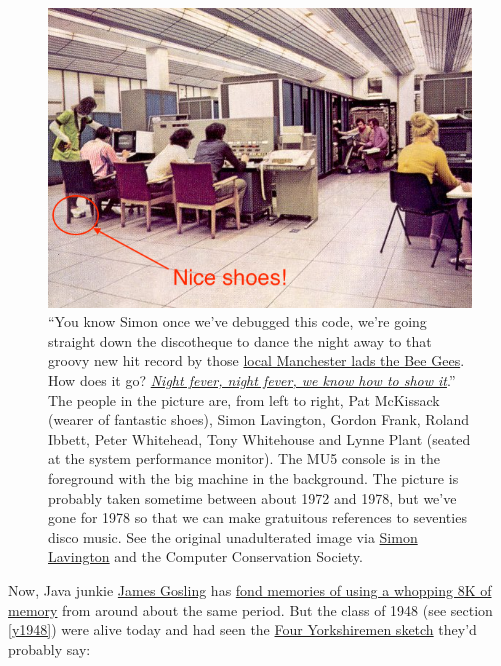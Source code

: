 \documentclass[
  12pt,
]{book}
\begin{document}
\begin{figure}

{\centering \includegraphics[width=0.99\linewidth]{images/classof1970something2} 

}

\caption{``You know Simon once we've debugged this code, we're going straight down the discotheque to dance the night away to that groovy new hit record by those \href{https://en.wikipedia.org/wiki/Bee_Gees}{local Manchester lads the Bee Gees}. How does it go? \emph{\href{https://en.wikipedia.org/wiki/Night_Fever}{Night fever, night fever, we know how to show it}}.'' The people in the picture are, from left to right, Pat McKissack (wearer of fantastic shoes), Simon Lavington, Gordon Frank, Roland Ibbett, Peter Whitehead, Tony Whitehouse and Lynne Plant (seated at the system performance monitor). The MU5 console is in the foreground with the big machine in the background. The picture is probably taken sometime between about 1972 and 1978, but we've gone for 1978 so that we can make gratuitous references to seventies disco music. See the original unadulterated image via \href{http://www.computinghistory.org.uk/det/3638/Simon-Lavington/}{Simon Lavington} and the Computer Conservation Society. \citep{mu5}}\label{fig:mu5-fig}
\end{figure}



Now, Java junkie \href{https://en.wikipedia.org/wiki/James_Gosling}{James Gosling} has \href{http://web.archive.org/web/20041010131526/http://today.java.net/jag/page6.html\#51}{fond memories of using a whopping 8K of memory} from around about the same period. \citep{gosling} But the class of 1948 (see section \ref{y1948}) were alive today and had seen the \href{https://en.wikipedia.org/wiki/Four_Yorkshiremen_sketch}{Four Yorkshiremen sketch} \citep{fouryorkshiremen} they'd probably say:
\end{document}
